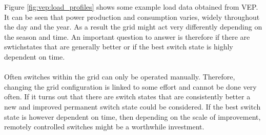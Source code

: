 Figure \ref{fig:vep:load_profiles} shows some example load data obtained from VEP. It can be seen
that power production and consumption varies, widely throughout the day and the year. As a result the grid
might act very differently depending on the season and time. An important question to answer is therefore if
there are swtichstates that are generally better or if the best switch state is highly dependent on
time.\\
\\
Often switches within the grid can only be operated manually\autocite{venios}. Therefore, changing the grid configuration is linked to
some effort and cannot be done very often. If it turns out that there are switch states that are consistently better
a new and improved permanent switch state could be considered. If the best switch state is
however dependent on time, then depending on the scale of improvement, remotely controlled switches might be a worthwhile
investment.